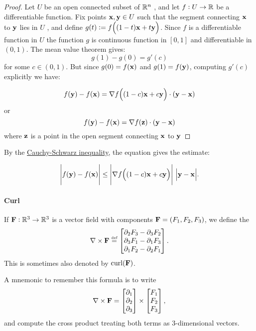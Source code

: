 \begin{proof}
Let \(U\) be an open connected subset of \(\mathbb{R}^n\) , and let \(f:U\to\mathbb{R}\)
be a differentiable function. Fix points \(\mathbf{ x},\mathbf{ y}\in U\) such that the
 segment connecting $\mathbf{ x}$ to $\mathbf{ y}$ lies in \(U\) , and define
\(g(t):=f\Big((1-t)\mathbf{ x}+t\mathbf{ y}\Big)\).
Since $f$ is a  differentiable function in $U$ the function $g$ is continuous function  in $[0,1]$
and differentiable in $(0,1)$. The mean value theorem gives:
\[g(1)-g(0)=g'(c)\]
for some $c\in (0,1)$. But since \(g(0)=f(\mathbf{ x})\)  and \(g(1)=f(\mathbf{ y})\), computing \(g'(c)\) explicitly we have:

\[f(\mathbf{ y})-f(\mathbf{ x})=\nabla f\Big((1-c)\mathbf{ x}+c\mathbf{ y}\Big)\cdot (\mathbf{ y}-\mathbf{ x})\]
or 
\[f(\mathbf{ y})-f(\mathbf{ x})=\nabla f(\mathbf{ z})\cdot (\mathbf{ y}-\mathbf{ x})\]
where $\mathbf{ z}$ is a point in the open segment connecting $\mathbf{ x}$ to $\mathbf{ y}$
\end{proof}

By the
\href{Cauchy-Schwarz_inequality}{Cauchy-Schwarz inequality}, the
equation gives the estimate:

\[\Bigg|f(\mathbf{ y})-f(\mathbf{ x})\Bigg|\le\Bigg|\nabla f\Big((1-c)\mathbf{ x}+c\mathbf{ y}\Big)\Bigg|\ \Big|\mathbf{ y} - \mathbf{ x}\Big|.\]


\paragraph{Curl}

 \begin{definition}
    If $\mathbf{ F}:\mathbb{R}^3 \to \mathbb{R}^3$ is a vector field with components $\mathbf{ F}=(F_1,F_2,F_3)$, we define the 
    \begin{equation*}
      \nabla \times \mathbf{ F} \stackrel{\scriptscriptstyle\text{def}}{=} \begin{bmatrix} 
	\partial_2 F_3 - \partial_3 F_2\\
	\partial_3 F_1 - \partial_1 F_3\\
	\partial_1 F_2 - \partial_2 F_1 \end{bmatrix}.
    \end{equation*}
    This is sometimes also denoted by $\operatorname{curl}(\mathbf{ F})$.
  \end{definition}

  \begin{remark}
    A mnemonic to remember this formula is to write
    \begin{equation*}
      \nabla \times \mathbf{ F} = \begin{bmatrix} \partial_1\\\partial_2\\\partial_3 \end{bmatrix} \times \begin{bmatrix} F_1\\F_2\\F_3 \end{bmatrix},
    \end{equation*}
    and compute the cross product treating both terms as 3-dimensional vectors.
  \end{remark}

